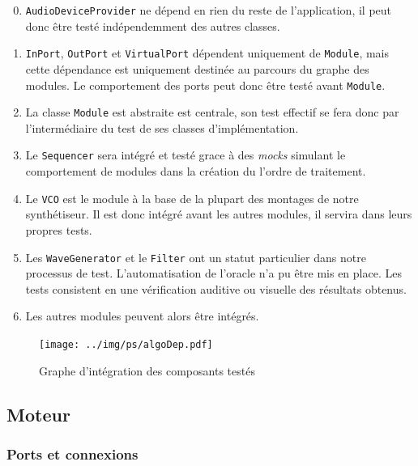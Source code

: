\begin{enumerate}
    \setcounter{enumi}{-1}
    \item  \texttt{AudioDeviceProvider} ne dépend en rien du reste de l'application, il peut donc être testé indépendemment des autres classes.
    \item \texttt{InPort}, \texttt{OutPort} et \texttt{VirtualPort} dépendent uniquement de \texttt{Module}, mais cette dépendance est uniquement destinée au parcours du graphe des modules. Le comportement des ports peut donc être testé avant \texttt{Module}.
    \item La classe \texttt{Module} est abstraite est centrale, son test effectif se fera donc par l'intermédiaire du test de ses classes d'implémentation.
    \item Le \texttt{Sequencer} sera intégré et testé grace à des \textit{mocks} simulant le comportement de modules dans la création du l'ordre de traitement.
    \item Le \texttt{VCO} est le module à la base de la plupart des montages de notre synthétiseur. Il est donc intégré avant les autres modules, il servira dans leurs propres tests.
    \item Les \texttt{WaveGenerator} et le \texttt{Filter} ont un statut particulier dans notre processus de test. L'automatisation de l'oracle n'a pu être mis en place. Les tests consistent en une vérification auditive ou visuelle des résultats obtenus.
    \item Les autres modules peuvent alors être intégrés.
\end{enumerate}

\begin{figure}[ht]
\centering
\texttt{[image: ../img/ps/algoDep.pdf]}
\caption{Graphe d’intégration des composants testés}
\label{integration}
\end{figure}


\subsection{Moteur}

\subsubsection{Ports et connexions}

